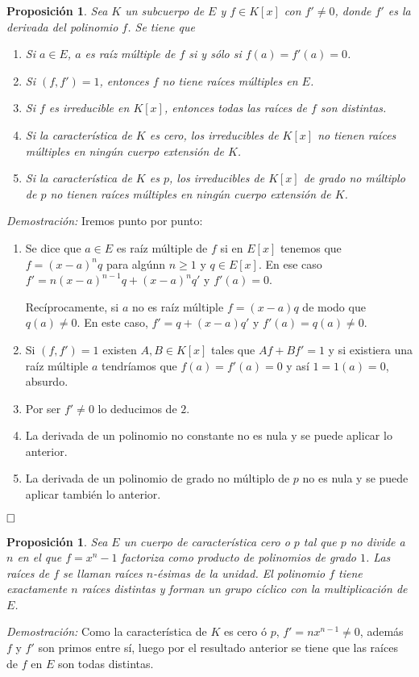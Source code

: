\documentclass[12pt]{article}
\newtheorem{proposition}[theorem]{Proposición}
\begin{document}
\begin{proposition}Sea $K$ un subcuerpo de $E$ y $f \in K[x]$ con $f' \neq 0$, donde $f'$ es la derivada del polinomio $f$. Se tiene que \begin{enumerate}
\item Si $a \in E$, $a$ es raíz múltiple de $f$ si y sólo si $f(a) = f'(a) = 0$. 
\item Si $(f,f')=1$, entonces $f$ no tiene raíces múltiples en $E$. 
\item Si $f$ es irreducible en $K[x]$, entonces todas las raíces de $f$ son distintas.
\item Si la característica de $K$ es cero, los irreducibles de $K[x]$ no tienen raíces múltiples en ningún cuerpo extensión de $K$.
\item Si la característica de $K$ es $p$, los irreducibles de $K[x]$ de grado no múltiplo de $p$ no tienen raíces múltiples en ningún cuerpo extensión de $K$.
\end{enumerate}
\end{proposition} 
\emph{Demostración: }Iremos punto por punto:\begin{enumerate}
\item Se dice que $a \in E$ es raíz múltiple de $f$ si en $E[x]$ tenemos que $f=(x-a)^nq$ para algúnn $n \geq 1$ y $q \in E[x]$. En ese caso $f' =n(x-a)^{n-1}q+(x-a)^nq'$ y $f'(a) = 0$.

Recíprocamente, si $a$ no es raíz múltiple $f=(x-a)q$ de modo que $q(a) \neq 0$. En este caso, $f'=q + (x-a)q'$ y $f'(a) =q(a) \neq 0$.
\item Si $(f,f') = 1$ existen $A,B \in K[x]$ tales que $Af+Bf'=1$ y si existiera una raíz múltiple $a$ tendríamos que $f(a) = f'(a) = 0$ y así $1=1(a) = 0$, absurdo.
\item Por ser $f'\neq 0$ lo deducimos de $2.$
\item La derivada de un polinomio no constante no es nula y se puede aplicar lo anterior.
\item La derivada de un polinomio de grado no múltiplo de $p$ no es nula y se puede aplicar también lo anterior.
\end{enumerate}

$\hfill \square$

\begin{proposition}Sea $E$ un cuerpo de característica cero o $p$ tal que $p$ no divide a $n$ en el que $f = x^n-1$ factoriza como producto de polinomios de grado $1$. Las raíces de $f$ se llaman raíces $n$-ésimas de la unidad. El polinomio $f$ tiene exactamente $n$ raíces distintas y forman un grupo cíclico con la multiplicación de $E$.
\end{proposition}
\emph{Demostración: }Como la característica de $K$ es cero ó $p$, $f' =nx^{n-1} \neq 0$, además $f$ y $f'$ son primos entre sí, luego por el resultado anterior se tiene que las raíces de $f$ en $E$ son todas distintas. 
\end{document}
